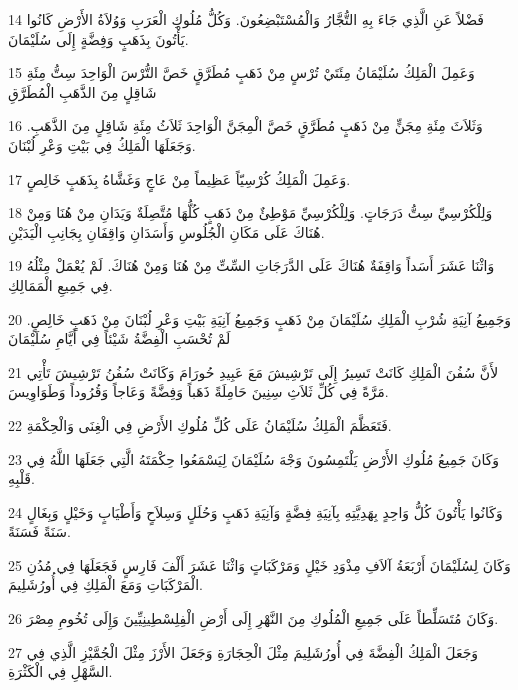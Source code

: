 \par 14 فَضْلاً عَنِ الَّذِي جَاءَ بِهِ التُّجَّارُ وَالْمُسْتَبْضِعُونَ. وَكُلُّ مُلُوكِ الْعَرَبِ وَوُلاَةُ الأَرْضِ كَانُوا يَأْتُونَ بِذَهَبٍ وَفِضَّةٍ إِلَى سُلَيْمَانَ.
\par 15 وَعَمِلَ الْمَلِكُ سُلَيْمَانُ مِئَتَيْ تُرْسٍ مِنْ ذَهَبٍ مُطَرَّقٍ خَصَّ التُّرْسَ الْوَاحِدَ سِتُّ مِئَةِ شَاقِلٍ مِنَ الذَّهَبِ الْمُطَرَّقِ
\par 16 وَثَلاَثَ مِئَةِ مِجَنٍّ مِنْ ذَهَبٍ مُطَرَّقٍ خَصَّ الْمِجَنَّ الْوَاحِدَ ثَلاَثُ مِئَةِ شَاقِلٍ مِنَ الذَّهَبِ. وَجَعَلَهَا الْمَلِكُ فِي بَيْتِ وَعْرِ لُبْنَانَ.
\par 17 وَعَمِلَ الْمَلِكُ كُرْسِيّاً عَظِيماً مِنْ عَاجٍ وَغَشَّاهُ بِذَهَبٍ خَالِصٍ.
\par 18 وَلِلْكُرْسِيِّ سِتُّ دَرَجَاتٍ. وَلِلْكُرْسِيِّ مَوْطِئٌ مِنْ ذَهَبٍ كُلُّهَا مُتَّصِلَةٌ وَيَدَانِ مِنْ هُنَا وَمِنْ هُنَاكَ عَلَى مَكَانِ الْجُلُوسِ وَأَسَدَانِ وَاقِفَانِ بِجَانِبِ الْيَدَيْنِ.
\par 19 وَاثْنَا عَشَرَ أَسَداً وَاقِفَةٌ هُنَاكَ عَلَى الدَّرَجَاتِ السِّتِّ مِنْ هُنَا وَمِنْ هُنَاكَ. لَمْ يُعْمَلْ مِثْلُهُ فِي جَمِيعِ الْمَمَالِكِ.
\par 20 وَجَمِيعُ آنِيَةِ شُرْبِ الْمَلِكِ سُلَيْمَانَ مِنْ ذَهَبٍ وَجَمِيعُ آنِيَةِ بَيْتِ وَعْرِ لُبْنَانَ مِنْ ذَهَبٍ خَالِصٍ. لَمْ تُحْسَبِ الْفِضَّةُ شَيْئاً فِي أَيَّامِ سُلَيْمَانَ
\par 21 لأَنَّ سُفُنَ الْمَلِكِ كَانَتْ تَسِيرُ إِلَى تَرْشِيشَ مَعَ عَبِيدِ حُورَامَ وَكَانَتْ سُفُنُ تَرْشِيشَ تَأْتِي مَرَّةً فِي كُلِّ ثَلاَثِ سِنِينَ حَامِلَةً ذَهَباً وَفِضَّةً وَعَاجاً وَقُرُوداً وَطَوَاوِيسَ.
\par 22 فَتَعَظَّمَ الْمَلِكُ سُلَيْمَانُ عَلَى كُلِّ مُلُوكِ الأَرْضِ فِي الْغِنَى وَالْحِكْمَةِ.
\par 23 وَكَانَ جَمِيعُ مُلُوكِ الأَرْضِ يَلْتَمِسُونَ وَجْهَ سُلَيْمَانَ لِيَسْمَعُوا حِكْمَتَهُ الَّتِي جَعَلَهَا اللَّهُ فِي قَلْبِهِ.
\par 24 وَكَانُوا يَأْتُونَ كُلُّ وَاحِدٍ بِهَدِيَّتِهِ بِآنِيَةِ فِضَّةٍ وَآنِيَةِ ذَهَبٍ وَحُلَلٍ وَسِلاَحٍ وَأَطْيَابٍ وَخَيْلٍ وَبِغَالٍ سَنَةً فَسَنَةً.
\par 25 وَكَانَ لِسُلَيْمَانَ أَرْبَعَةُ آلاَفِ مِذْوَدِ خَيْلٍ وَمَرْكَبَاتٍ وَاثْنَا عَشَرَ أَلْفَ فَارِسٍ فَجَعَلَهَا فِي مُدُنِ الْمَرْكَبَاتِ وَمَعَ الْمَلِكِ فِي أُورُشَلِيمَ.
\par 26 وَكَانَ مُتَسَلِّطاً عَلَى جَمِيعِ الْمُلُوكِ مِنَ النَّهْرِ إِلَى أَرْضِ الْفِلِسْطِينِيِّينَ وَإِلَى تُخُومِ مِصْرَ.
\par 27 وَجَعَلَ الْمَلِكُ الْفِضَّةَ فِي أُورُشَلِيمَ مِثْلَ الْحِجَارَةِ وَجَعَلَ الأَرْزَ مِثْلَ الْجُمَّيْزِ الَّذِي فِي السَّهْلِ فِي الْكَثْرَةِ.
